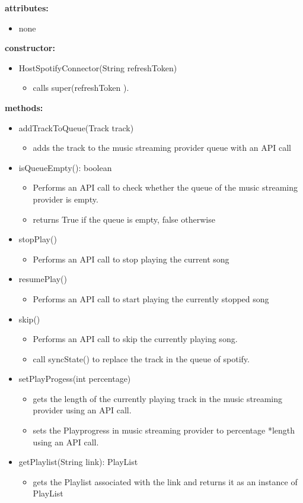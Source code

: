 \documentclass[oneside, ngerman]{sdqtechreport}
\begin{document}
\textbf{attributes:}
\begin{itemize}
    \item none
\end{itemize}
\textbf{constructor:}
\begin{itemize}
    \item HostSpotifyConnector(String refreshToken)
    \begin{itemize}
        \item calls super(refreshToken ).
    \end{itemize}
\end{itemize}
\textbf{methods:}
\begin{itemize}
    \item addTrackToQueue(Track track)
    \begin{itemize}
        \item adds the track to the music streaming provider queue with an API call
    \end{itemize}
    \item isQueueEmpty(): boolean
    \begin{itemize}
        \item Performs an API call to check whether the queue of the music streaming provider is empty.
        \item returns True if the queue is empty, false otherwise
    \end{itemize}
    \item stopPlay()
    \begin{itemize}
        \item Performs an API call to stop playing the current song
    \end{itemize}
    \item resumePlay()
    \begin{itemize}
        \item Performs an API call to start playing the currently stopped song
    \end{itemize}
    \item skip()
    \begin{itemize}
        \item Performs an API call to skip the currently playing song.
        \item call syncState() to replace the track in the queue of spotify.
    \end{itemize}
    \item setPlayProgess(int percentage)
    \begin{itemize}
        \item gets the length of the currently playing track in the music streaming provider using an API call.
        \item sets the Playprogress in music streaming provider to  percentage *length using an API call.
    \end{itemize}
    \item getPlaylist(String link): PlayList
    \begin{itemize}
        \item gets the Playlist associated with the link and returns it as an instance of PlayList
    \end{itemize}
\end{itemize}
\end{document}
